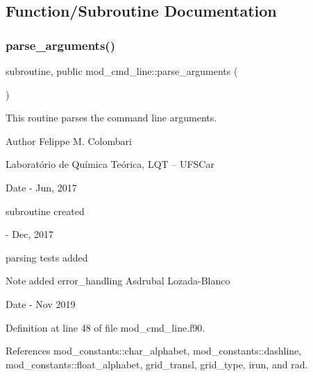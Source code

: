 \subsection{Function/\+Subroutine Documentation}
\mbox{\label{namespacemod__cmd__line_a2869d8f148b9b3ad22cf98c7ac4fcc40}} 
\subsubsection{\texorpdfstring{parse\+\_\+arguments()}{parse\_arguments()}}
{\footnotesize\ttfamily subroutine, public mod\+\_\+cmd\+\_\+line\+::parse\+\_\+arguments (\begin{DoxyParamCaption}{ }\end{DoxyParamCaption})}



This routine parses the command line arguments. 

\begin{DoxyAuthor}{Author}
Felippe M. Colombari
\begin{DoxyItemize}
\item Laboratório de Química Teórica, L\+QT -- U\+F\+S\+Car 
\end{DoxyItemize}
\end{DoxyAuthor}
\begin{DoxyDate}{Date}
-\/ Jun, 2017
\begin{DoxyItemize}
\item subroutine created 
\end{DoxyItemize}

-\/ Dec, 2017
\begin{DoxyItemize}
\item parsing tests added 
\end{DoxyItemize}
\end{DoxyDate}
\begin{DoxyNote}{Note}
added error\+\_\+handling Asdrubal Lozada-\/\+Blanco 
\end{DoxyNote}
\begin{DoxyDate}{Date}
-\/ Nov 2019 
\end{DoxyDate}


Definition at line 48 of file mod\+\_\+cmd\+\_\+line.\+f90.



References mod\+\_\+constants\+::char\+\_\+alphabet, mod\+\_\+constants\+::dashline, mod\+\_\+constants\+::float\+\_\+alphabet, grid\+\_\+transl, grid\+\_\+type, irun, and rad.



